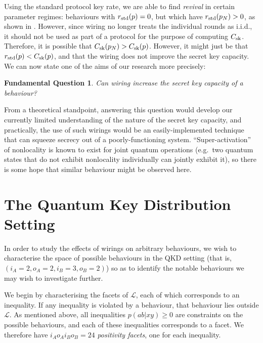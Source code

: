\documentclass[10pt, a4paper]{article}
\numberwithin{equation}{section} %
\theoremstyle{definition}
\theoremstyle{plain}
\newtheorem{funqn}{Fundamental Question}
\newcommand{\?}{\mathrel{?}} %
\newcommand{\Ls}{\mathcal{L}}
\newcommand{\sk}{\rm sk}
\newcommand{\std}{\rm std}
\begin{document}
      Using the standard protocol key rate, we are able to find \emph{revival} in certain parameter regimes: behaviours with \(r_{\std}(p) = 0\), but which have \(r_{\std}(p_N) > 0\), as shown in . However, since wiring no longer treats the individual rounds as i.i.d., it should not be used as part of a protocol for the purpose of computing \(C_{\sk}\). Therefore, it is possible that \(C_{\sk}(p_N) > C_{\sk}(p)\). However, it might just be that \(r_{\std}(p) < C_{\sk}(p)\), and that the wiring does not improve the secret key capacity. We can now state one of the aims of our research more precisely:
      \begin{funqn}\label{fqn:wircap}
        Can wiring increase the secret key capacity of a behaviour?
      \end{funqn}

      From a theoretical standpoint, answering this question would develop our currently limited understanding of the nature of the secret key capacity, and practically, the use of such wirings would be an easily-implemented technique that can squeeze secrecy out of a poorly-functioning system. ``Super-activation'' of nonlocality is known to exist for joint quantum operations (e.g.\ two quantum states that do not exhibit nonlocality individually can jointly exhibit it), so there is some hope that similar behaviour might be observed here.

      \section{The Quantum Key Distribution Setting}\label{sec:qkdset}

      In order to study the effects of wirings on arbitrary behaviours, we wish to characterise the space of possible behaviours in the QKD setting (that is, \((i_A=2,o_A=2,i_B=3,o_B=2)\)) so as to identify the notable behaviours we may wish to investigate further.

      We begin by characterising the facets of \(\Ls\), each of which corresponds to an inequality. If any inequality is violated by a behaviour, that behaviour lies outside \(\Ls\). As mentioned above, all inequalities \(p(ab|xy) \geq 0\) are constraints on the possible behaviours, and each of these inequalities corresponds to a facet. We therefore have \(i_A o_A i_B o_B = 24\) \emph{positivity facets}, one for each inequality.
\end{document}
